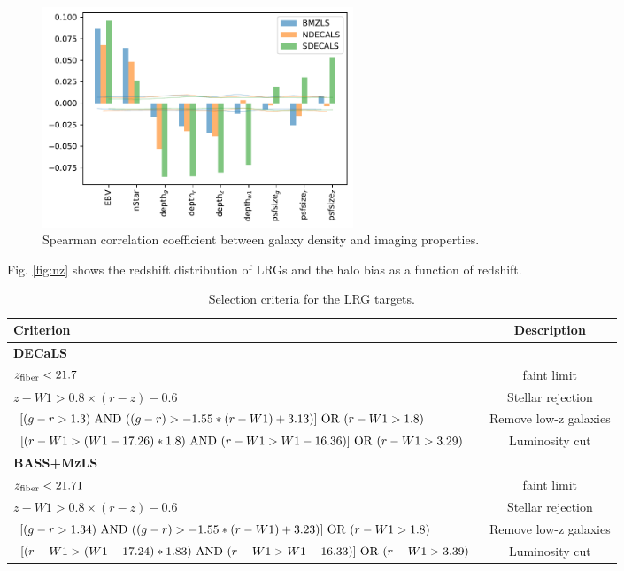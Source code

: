 \begin{figure}
    \includegraphics[width=0.45\textwidth]{figures/pcc.pdf} 
    \caption{Spearman correlation coefficient between galaxy density and imaging properties.}
    \label{fig:pcc}
\end{figure}

Fig. \ref{fig:nz} shows the redshift distribution of LRGs and the halo bias as a function of redshift. 



\begin{table}
  \begin{center}
    \caption{Selection criteria for the LRG targets.}
    \label{tab:ts}
    \begin{tabular}{lc}
    \hline
      \textbf{Criterion} &\textbf{Description}\\
      \hline   
     \textbf{DECaLS} & \\ 
     $z_{\rm fiber} < 21.7$  & faint limit  \\
     $z - W1 > 0.8 \times (r - z) - 0.6$ & Stellar rejection  \\
     $[(g-r >1.3)~{\rm AND}~((g-r) > -1.55*(r-W1) + 3.13)]~{\rm OR}~(r -W 1 > 1.8)$ & Remove low-z galaxies \\
     $[(r-W1 > (W1 - 17.26)*1.8)~{\rm AND}~(r - W1 > W1 - 16.36)]~{\rm OR}~(r-W1 > 3.29)$ & Luminosity cut \\ 
    \hline
     \textbf{BASS+MzLS} & \\ 
     $z_{\rm fiber} < 21.71$  & faint limit  \\
     $z - W1 > 0.8 \times (r - z) - 0.6$ & Stellar rejection  \\
     $[(g-r >1.34)~{\rm AND}~((g-r) > -1.55*(r-W1) + 3.23)]~{\rm OR}~(r -W 1 > 1.8)$ & Remove low-z galaxies \\
     $[(r-W1 > (W1 - 17.24)*1.83)~{\rm AND}~(r - W1 > W1 - 16.33)]~{\rm OR}~(r-W1 > 3.39)$ & Luminosity cut \\ 
      \hline
      \end{tabular}
  \end{center}
\end{table}